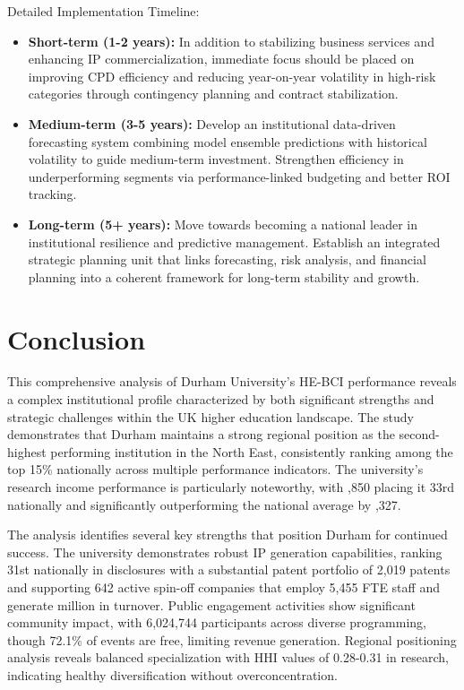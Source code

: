 \documentclass[journal,onecolumn, 10pt,draftclsnofoot]{IEEEtran}
\begin{document}
Detailed Implementation Timeline:

\begin{itemize}
    \item \textbf{Short-term (1-2 years):} In addition to stabilizing business services and enhancing IP commercialization, immediate focus should be placed on improving CPD efficiency and reducing year-on-year volatility in high-risk categories through contingency planning and contract stabilization.
    
    \item \textbf{Medium-term (3-5 years):} Develop an institutional data-driven forecasting system combining model ensemble predictions with historical volatility to guide medium-term investment. Strengthen efficiency in underperforming segments via performance-linked budgeting and better ROI tracking.
    
    \item \textbf{Long-term (5+ years):} Move towards becoming a national leader in institutional resilience and predictive management. Establish an integrated strategic planning unit that links forecasting, risk analysis, and financial planning into a coherent framework for long-term stability and growth.
\end{itemize}

\section{Conclusion}

This comprehensive analysis of Durham University's HE-BCI performance reveals a complex institutional profile characterized by both significant strengths and strategic challenges within the UK higher education landscape. The study demonstrates that Durham maintains a strong regional position as the second-highest performing institution in the North East, consistently ranking among the top 15\% nationally across multiple performance indicators. The university's research income performance is particularly noteworthy, with ,850 placing it 33rd nationally and significantly outperforming the national average by ,327.

The analysis identifies several key strengths that position Durham for continued success. The university demonstrates robust IP generation capabilities, ranking 31st nationally in disclosures with a substantial patent portfolio of 2,019 patents and supporting 642 active spin-off companies that employ 5,455 FTE staff and generate  million in turnover. Public engagement activities show significant community impact, with 6,024,744 participants across diverse programming, though 72.1\% of events are free, limiting revenue generation. Regional positioning analysis reveals balanced specialization with HHI values of 0.28-0.31 in research, indicating healthy diversification without overconcentration.
\end{document}
